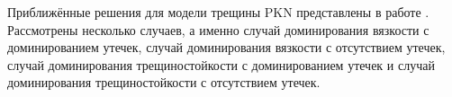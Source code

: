 Приближённые решения для модели трещины PKN представлены в работе \cite{dontsov2021analysis}.
Рассмотрены несколько случаев, а именно случай доминирования вязкости с доминированием утечек, случай доминирования вязкости с отсутствием утечек, случай доминирования трещиностойкости с доминированием утечек и случай доминирования трещиностойкости с отсутствием утечек.







